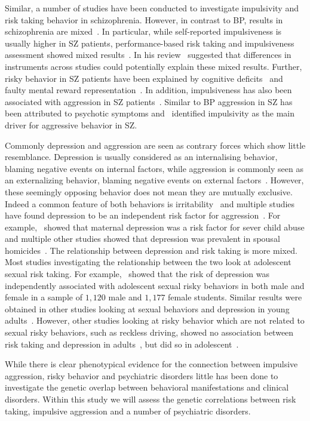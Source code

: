 Similar, a number of studies have been conducted to investigate impulsivity and risk taking behavior in schizophrenia.
However, in contrast to BP, results in schizophrenia are mixed~\cite{Reddy2014}.
In particular, while self-reported impulsiveness is usually higher in SZ patients, performance-based risk taking and impulsiveness assessment showed mixed results~\cite{Ouzir2013}.
In his review~\citet{Ouzir2013} suggested that differences in instruments across studies could potentially explain these mixed results.
Further, risky behavior in SZ patients have been explained by cognitive deficits~\cite{Cheng2012} and faulty mental reward representation~\cite{Heerey2011}.
In addition, impulsiveness has also been associated with aggression in SZ patients~\cite{Hoptman2015}.
Similar to BP aggression in SZ has been attributed to psychotic symptoms and~\citet{Hoptman2015} identified impulsivity as the main driver for aggressive behavior in SZ\@.

Commonly depression and aggression are seen as contrary forces which show little resemblance.
Depression is usually considered as an internalising behavior, blaming negative events on internal factors, while aggression is commonly seen as an externalizing behavior, blaming negative events on external factors~\cite{APA1994,AmericanPsychiatricAssociation2013}.
However, these seemingly opposing behavior does not mean they are mutually exclusive. 
Indeed a common feature of both behaviors is irritability~\cite{Dutton2013} and multiple studies have found depression to be an independent risk factor for aggression~\cite{Sher2005,Roland2002,Taft2009, Dutton2013}.
For example,~\citet{Windham2004} showed that maternal depression was a risk factor for sever child abuse and multiple other studies showed that depression was prevalent in spousal homicides~\cite{Stith2004}.
The relationship between depression and risk taking is more mixed.
Most studies investigating the relationship between the two look at adolescent sexual risk taking.
For example,~\citet{Wilson2010} showed that the risk of depression was independently associated with adolescent sexual risky behaviors in both male and female in a sample of $1,120$ male and $1,177$ female students.
Similar results were obtained in other studies looking at sexual behaviors and depression in young adults~\cite{Auerbach2010,Auerbach2007,Othieno2015}.
However, other studies looking at risky behavior which are not related to sexual risky behaviors, such as reckless driving, showed no association between risk taking and depression in adults~\cite{Vassallo2008}, but did so in adolescent~\cite{McDonald2014}. 

While there is clear phenotypical evidence for the connection between impulsive aggression, risky behavior and psychiatric disorders little has been done to investigate the genetic overlap between behavioral manifestations and clinical disorders.
Within this study we will assess the genetic correlations between risk taking, impulsive aggression and a number of psychiatric disorders.

